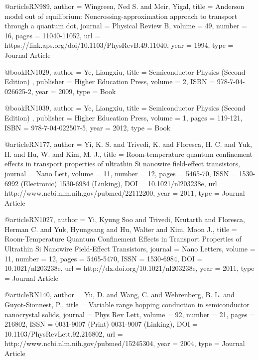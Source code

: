 @article{RN989,
   author = {Wingreen, Ned S. and Meir, Yigal},
   title = {Anderson model out of equilibrium: Noncrossing-approximation approach to transport through a quantum dot},
   journal = {Physical Review B},
   volume = {49},
   number = {16},
   pages = {11040-11052},
   url = {https://link.aps.org/doi/10.1103/PhysRevB.49.11040},
   year = {1994},
   type = {Journal Article}
}

@book{RN1029,
   author = {Ye, Liangxiu},
   title = {Semiconductor Physics (Second Edition) },
   publisher = {Higher Education Press},
   volume = {2},
   ISBN = {978-7-04-026625-2},
   year = {2009},
   type = {Book}
}

@book{RN1039,
   author = {Ye, Liangxiu},
   title = {Semiconductor Physics (Second Edition) },
   publisher = {Higher Education Press},
   volume = {1},
   pages = {119-121},
   ISBN = {978-7-04-022507-5},
   year = {2012},
   type = {Book}
}

@article{RN177,
   author = {Yi, K. S. and Trivedi, K. and Floresca, H. C. and Yuk, H. and Hu, W. and Kim, M. J.},
   title = {Room-temperature quantum confinement effects in transport properties of ultrathin Si nanowire field-effect transistors},
   journal = {Nano Lett},
   volume = {11},
   number = {12},
   pages = {5465-70},
   ISSN = {1530-6992 (Electronic)
1530-6984 (Linking)},
   DOI = {10.1021/nl203238e},
   url = {http://www.ncbi.nlm.nih.gov/pubmed/22112200},
   year = {2011},
   type = {Journal Article}
}

@article{RN1027,
   author = {Yi, Kyung Soo and Trivedi, Krutarth and Floresca, Herman C. and Yuk, Hyungsang and Hu, Walter and Kim, Moon J.},
   title = {Room-Temperature Quantum Confinement Effects in Transport Properties of Ultrathin Si Nanowire Field-Effect Transistors},
   journal = {Nano Letters},
   volume = {11},
   number = {12},
   pages = {5465-5470},
   ISSN = {1530-6984},
   DOI = {10.1021/nl203238e},
   url = {http://dx.doi.org/10.1021/nl203238e},
   year = {2011},
   type = {Journal Article}
}

@article{RN140,
   author = {Yu, D. and Wang, C. and Wehrenberg, B. L. and Guyot-Sionnest, P.},
   title = {Variable range hopping conduction in semiconductor nanocrystal solids},
   journal = {Phys Rev Lett},
   volume = {92},
   number = {21},
   pages = {216802},
   ISSN = {0031-9007 (Print)
0031-9007 (Linking)},
   DOI = {10.1103/PhysRevLett.92.216802},
   url = {http://www.ncbi.nlm.nih.gov/pubmed/15245304},
   year = {2004},
   type = {Journal Article}
}

